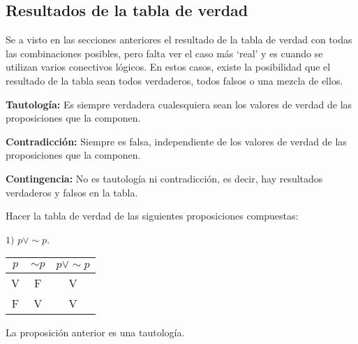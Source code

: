 
\subsection{Resultados de la tabla de verdad}
Se a visto en las secciones anteriores el resultado de la tabla de verdad con todas las combinaciones posibles, pero falta ver el caso más `real' y es cuando se utilizan varios conectivos lógicos. En estos casos, existe la posibilidad que el resultado de la tabla sean todos verdaderos, todos falsos o una mezcla de ellos.\\

\begin{mydef}
\textbf{Tautología:} Es siempre verdadera cualesquiera sean los valores de verdad de las proposiciones que la componen.
\end{mydef}

\begin{mydef}
\textbf{Contradicción:} Siempre es falsa, independiente de los valores de verdad de las proposiciones que la componen.
\end{mydef}

\begin{mydef}
\textbf{Contingencia:} No es tautología ni contradicción, es decir, hay resultados verdaderos y falsos en la tabla.
\end{mydef}


\begin{myexample}
Hacer la tabla de verdad de las siguientes proposiciones compuestas:
\end{myexample}
$1)$ $p\vee\sim p$.\\
\begin{center}
	\begin{tabular}{|c|c|c|}
\hline
$p$&$\sim p$&$p\vee\sim p$\\
\hline
V&F&V\\
\hline
F&V&V\\
\hline
	\end{tabular}
\end{center}
La proposición anterior es una tautología.\\

